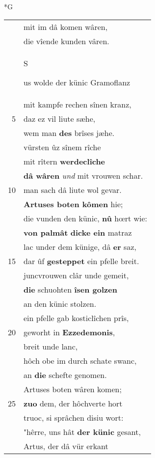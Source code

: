 \documentclass[8pt,a4paper,notitlepage]{article}
\begin{document}
\begin{table}[ht]
\begin{minipage}[t]{0.5\linewidth}
\small
\begin{center}*G
\end{center}
\begin{tabular}{rl}
 & mit im dâ komen wâren,\\ 
 & die vîende kunden vâren.\\ 
 & \begin{large}S\end{large}us wolde der künic Gramoflanz\\ 
 & mit kampfe rechen sînen kranz,\\ 
5 & daz ez vil liute sæhe,\\ 
 & wem man \textbf{des} brîses jæhe.\\ 
 & vürsten ûz sînem rîche\\ 
 & mit rîtern \textbf{werdeclîche}\\ 
 & \textbf{dâ wâren} \textit{und} mit vrouwen schar.\\ 
10 & man sach dâ liute wol gevar.\\ 
 & \textbf{Artuses boten kômen} hie;\\ 
 & die vunden den künic, \textbf{nû} hœrt wie:\\ 
 & \textbf{von palmât} \textbf{dicke ein} matraz\\ 
 & lac under dem künige, dâ \textbf{er} saz,\\ 
15 & dar ûf \textbf{gesteppet} ein pfelle breit.\\ 
 & juncvrouwen clâr unde gemeit,\\ 
 & \textbf{die} schuohten \textbf{îsen golzen}\\ 
 & an den künic stolzen.\\ 
 & ein pfelle gab kosticlîchen  prîs,\\ 
20 & geworht in \textbf{Ezzedemonis},\\ 
 & breit unde lanc,\\ 
 & hôch obe im durch schate swanc,\\ 
 & an \textbf{die} schefte genomen.\\ 
 & Artuses boten wâren komen;\\ 
25 & \textbf{zuo} dem, der hôchverte hort\\ 
 & truoc, si sprâchen disiu wort:\\ 
 & "hêrre, uns hât \textbf{der künic} gesant,\\ 
 & Artus, der dâ vür erkant\\ 

\end{tabular}
\end{minipage}
\end{table}
\end{document}
